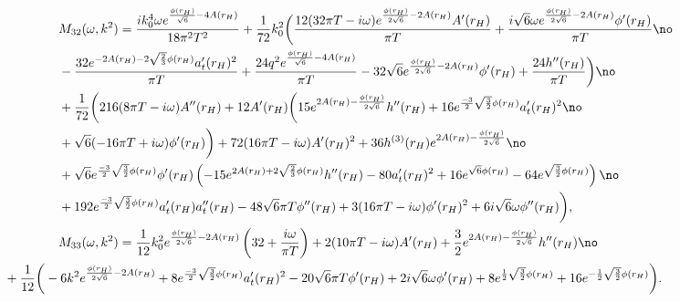 \documentclass[preprintnumbers,aps,prd,longbibliography,nofootinbib,nobibnotes,amsmath,amssymb]{revtex4}
\begin{document}
		\begin{align}
			&M_{3 2}(\omega, k^2) = \frac{i k_0^4 \omega  e^{\frac{\phi(r_H)}{\sqrt{6}}-4 A(r_H)}}{18 \pi ^2 T^2} + \frac{1}{72} k_0^2 \bigg(\frac{12 (32 \pi  T-i \omega ) e^{\frac{\phi(r_H)}{2 \sqrt{6}}-2 A(r_H)} A'(r_H)}{\pi  T} +\frac{i \sqrt{6} \omega  e^{\frac{\phi(r_H)}{2 \sqrt{6}}-2 A(r_H)} \phi'(r_H)}{\pi  T}\no\\
			&-\frac{32 e^{-2 A(r_H)-2 \sqrt{\frac{2}{3}} \phi(r_H)} a_t'(r_H)^2}{\pi  T}+\frac{24 q^2 e^{\frac{\phi(r_H)}{\sqrt{6}}-4 A(r_H)}}{\pi  T}-32 \sqrt{6} e^{\frac{\phi(r_H)}{2 \sqrt{6}}-2 A(r_H)} \phi'(r_H)+\frac{24 h''(r_H)}{\pi  T}\bigg) \no\\
			&+ \frac{1}{72} \bigg(216 (8 \pi  T-i \omega ) A''(r_H)+12 A'(r_H) \bigg(15 e^{2 A(r_H)-\frac{\phi(r_H)}{2 \sqrt{6}}} h''(r_H)+16 e^{\frac{-3}{2} \sqrt{\frac{3}{2}} \phi(r_H)} a_t'(r_H)^2\no\\
			&+\sqrt{6} (-16 \pi  T+i \omega ) \phi'(r_H)\bigg)+72 (16 \pi  T-i \omega ) A'(r_H)^2 +36 h^{(3)}(r_H) e^{2 A(r_H)-\frac{\phi(r_H)}{2 \sqrt{6}}}\no\\
			&+\sqrt{6} e^{\frac{-3}{2} \sqrt{\frac{3}{2}} \phi(r_H)} \phi'(r_H) \left(-15 e^{2 A(r_H)+2 \sqrt{\frac{2}{3}} \phi(r_H)} h''(r_H)-80 a_t'(r_H)^2+16 e^{\sqrt{6} \phi(r_H)}-64 e^{\sqrt{\frac{3}{2}} \phi(r_H)}\right)\no\\
			&+192 e^{\frac{-3}{2}  \sqrt{\frac{3}{2}} \phi(r_H)} a_t'(r_H) a_t''(r_H)-48 \sqrt{6} \pi  T \phi''(r_H)+3 (16 \pi  T-i \omega ) \phi'(r_H)^2+6 i \sqrt{6} \omega  \phi''(r_H)\bigg),\nonumber\\
				&M_{3 3}(\omega, k^2) = \frac{1}{12} k_0^2 e^{\frac{\phi(r_H)}{2 \sqrt{6}}-2 A(r_H)} \left(32 +\frac{i \omega }{\pi  T}\right)  + 2  (10 \pi  T-i \omega ) A'(r_H) + \frac{3}{2}  e^{2 A(r_H)-\frac{\phi(r_H)}{2 \sqrt{6}}} h''(r_H)\no\\
				&\hspace{-1.5cm}+ \frac{1}{12} \bigg(-6 k^2 e^{\frac{\phi(r_H)}{2 \sqrt{6}}-2 A(r_H)}+8 e^{\frac{-3}{2}  \sqrt{\frac{3}{2}} \phi(r_H)} a_t'(r_H)^2-20 \sqrt{6} \pi  T \phi'(r_H)+2 i \sqrt{6} \omega  \phi'(r_H)+8 e^{\frac{1}{2} \sqrt{\frac{3}{2}} \phi(r_H)}+16 e^{-\frac{1}{2} \sqrt{\frac{3}{2}} \phi(r_H)}\bigg).\nonumber
\end{align}
\end{document}
